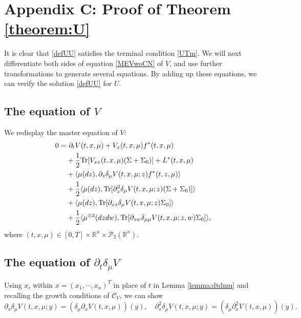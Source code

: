 \documentclass{amsart}
\theoremstyle{definition}
\theoremstyle{remark}
\def\cal{\mathcal}
\def\D{\partial}
\numberwithin{equation}{section}
\begin{document}
\section*{Appendix C: Proof of Theorem \ref{theorem:U}}
\renewcommand{\theequation}{C.\arabic{equation}}
\setcounter{equation}{0}
\renewcommand{\thetheorem}{C.\arabic{theorem}}
\setcounter{theorem}{0}
\renewcommand{\thesubsection}{C.\arabic{subsection}}
\setcounter{subsection}{0}

It is clear that \eqref{defUU} satisfies the terminal condition \eqref{UTm}.
We will next differentiate both sides of equation \eqref{MEVwoCN} of $V$, and use further transformations to generate several equations. By adding up these equations, we can verify the solution \eqref{defUU} for $U$.


\subsection{The  equation of $V$}
 We redisplay the master equation of $V$:
\begin{align}
0=&\ \partial_t V(t, x, \mu)+   V_x (t, x, \mu)
f^*(t,x,  \mu)
 \notag \\
&+ \frac{1}{2} {\rm Tr}
[ V_{xx}(t, x, \mu)(\Sigma+ \Sigma_0) ] + L^*(t,x,  \mu)\notag \\
& +\langle  \mu(dz), \partial_z\delta_\mu V(t,x, \mu; z) f^*(t, z,\mu)\rangle \notag  \\
& +\frac{1}{2}\langle  \mu(dz), {\rm Tr}[
\partial_{z}^2 \delta_\mu
V(t, x, \mu; z) (\Sigma+\Sigma_0)]\rangle \notag \\
&+ \langle \mu(dz), {\rm Tr} [ \D_{xz}\delta_\mu V(t,x, \mu;z)  \Sigma_0 ]\rangle \notag  \\
&+\frac{1}{2}\langle \mu^{\otimes2} (dzdw), {\rm Tr}[\D_{zw}\delta_{\mu\mu} V (t, x, \mu; z,w)
\Sigma_0]\rangle ,\notag
\end{align}
where
 $(t,x,\mu)\in[0,T]\times \mathbb{R}^n\times
 {\cal P}_2(\mathbb{R}^n)  $.




\subsection{The equation  of $\partial_t\delta_\mu V$}

Using $x_i$ within $x=(x_1, \cdots, x_n)^T$ in place of
$t$ in Lemma \ref{lemma:dtdmu} and recalling the growth conditions of ${\cal C}_V$, we can show
$$
\partial_x\delta_\mu V(t,x,\mu;y)=(\delta_\mu \partial_x V(t,x,\mu))(y), \quad  \partial_{x}^2\delta_\mu V(t,x,\mu;y)=(\delta_\mu \partial_x^2 V(t,x,\mu))(y).
$$
\end{document}
